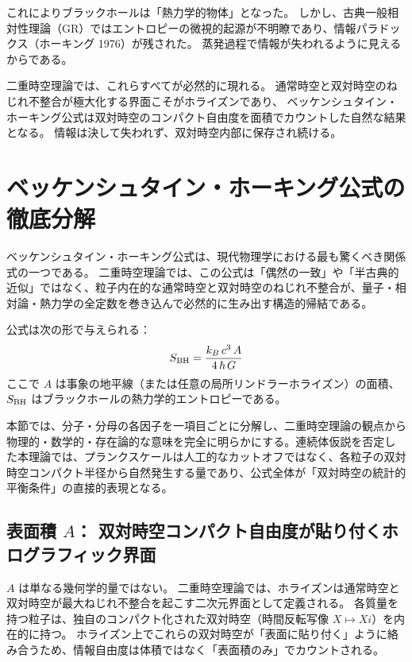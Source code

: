 \documentclass[dvipdfmx,a4paper]{jsbook}
\theoremstyle{definition}
\theoremstyle{remark}
\begin{document}
これによりブラックホールは「熱力学的物体」となった。
しかし、古典一般相対性理論（GR）ではエントロピーの微視的起源が不明瞭であり、情報パラドックス（ホーキング 1976）が残された。
蒸発過程で情報が失われるように見えるからである。

二重時空理論では、これらすべてが必然的に現れる。
通常時空と双対時空のねじれ不整合が極大化する界面こそがホライズンであり、
ベッケンシュタイン・ホーキング公式は双対時空のコンパクト自由度を面積でカウントした自然な結果となる。
情報は決して失われず、双対時空内部に保存され続ける。

\section{ベッケンシュタイン・ホーキング公式の徹底分解}

ベッケンシュタイン・ホーキング公式は、現代物理学における最も驚くべき関係式の一つである。
二重時空理論では、この公式は「偶然の一致」や「半古典的近似」ではなく、粒子内在的な通常時空と双対時空のねじれ不整合が、量子・相対論・熱力学の全定数を巻き込んで必然的に生み出す構造的帰結である。

公式は次の形で与えられる：
\begin{equation}
  S_{\rm BH} = \frac{k_B \, c^3 \, A}{4 \, \hbar \, G}
  \label{eq:bh-entropy-full}
\end{equation}
ここで $A$ は事象の地平線（または任意の局所リンドラーホライズン）の面積、$S_{\rm BH}$ はブラックホールの熱力学的エントロピーである。

本節では、分子・分母の各因子を一項目ごとに分解し、二重時空理論の観点から物理的・数学的・存在論的な意味を完全に明らかにする。連続体仮説を否定した本理論では、プランクスケールは人工的なカットオフではなく、各粒子の双対時空コンパクト半径から自然発生する量であり、公式全体が「双対時空の統計的平衡条件」の直接的表現となる。

\subsection{表面積 $A$： 双対時空コンパクト自由度が貼り付くホログラフィック界面}

$A$ は単なる幾何学的量ではない。  
二重時空理論では、ホライズンは通常時空と双対時空が最大ねじれ不整合を起こす二次元界面として定義される。  
各質量を持つ粒子は、独自のコンパクト化された双対時空（時間反転写像 $X \mapsto Xi$）を内在的に持つ。  
ホライズン上でこれらの双対時空が「表面に貼り付く」ように絡み合うため、情報自由度は体積ではなく「表面積のみ」でカウントされる。
\end{document}
